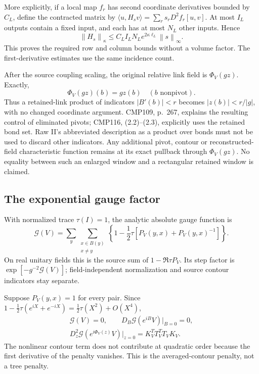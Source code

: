 \documentclass[11pt]{article}
\newcommand{\norm}[1]{\left\|#1\right\|}
\begin{document}
More explicitly, if a local map $f_r$ has second coordinate
derivatives bounded by $C_L$, define the contracted matrix by
$\langle u,H_sv\rangle=\sum_rs_rD^2f_r[u,v]$. At most $I_L$
outputs contain a fixed input, and each has at most $N_L$
other inputs. Hence
\begin{equation}\label{pc-contracted-tensor}
 \norm{H_s}_\kappa\le
 C_LI_LN_Le^{2\kappa\ell_L}\norm s_\infty.
\end{equation}
This proves the required row and column bounds without a volume
factor. The first-derivative estimates use the same incidence
count.

After the source coupling scaling, the original relative link
field is $\Phi_V(gz)$. Exactly,
\begin{equation}\label{pc-cutoff-identity}
 \Phi_V(gz)(b)=gz(b)\quad(b\text{ nonpivot}).
\end{equation}
Thus a retained-link product of indicators $|B'(b)|<r$ becomes
$|z(b)|<r/|g|$, with no changed coordinate argument. CMP109,
p.~267, explains the resulting control of eliminated pivots;
CMP116, (2.2)--(2.3), explicitly uses the retained bond set.
Raw II's abbreviated description as a product over bonds must
not be used to discard other indicators. Any additional pivot,
contour or reconstructed-field characteristic function remains
at its exact pullback through $\Phi_V(gz)$. No equality between
such an enlarged window and a rectangular retained window is
claimed.

\subsection{The exponential gauge factor}
\label{pc-gauge-section}

With normalized trace $\tau(I)=1$, the analytic absolute gauge
function is
\begin{equation}\label{pc-gauge-function}
 \mathcal G(V)=\sum_y\sum_{\substack{x\in B(y)\\x\ne y}}
 \left\{1-\frac12\tau[P_V(y,x)+P_V(y,x)^{-1}]\right\}.
\end{equation}
On real unitary fields this is the source sum of
$1-\Re\tau P_V$. Its step factor is
$\exp[-g^{-2}\mathcal G(V)]$; field-independent normalization
and source contour indicators stay separate.

Suppose $P_V(y,x)=1$ for every pair. Since
$1-\tfrac12\tau(e^{iX}+e^{-iX})=\tfrac12\tau(X^2)+O(X^4)$,
\begin{equation}\label{pc-gauge-hessian}
 \begin{gathered}
 \mathcal G(V)=0,\qquad
 D_B\mathcal G(e^{iB}V)|_{B=0}=0,\\
 D_z^2\mathcal G(e^{i\Phi_V(z)}V)|_{z=0}
      =K_V^TT_V^TT_VK_V.
 \end{gathered}
\end{equation}
The nonlinear contour term does not contribute at quadratic
order because the first derivative of the penalty vanishes.
This is the averaged-contour penalty, not a tree penalty.
\end{document}
